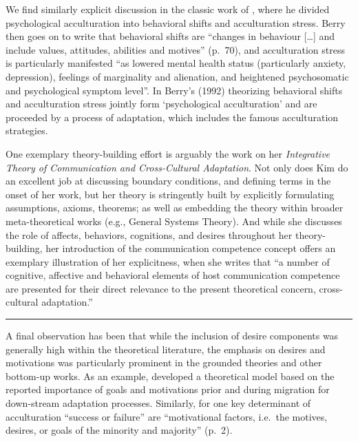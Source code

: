 We find similarly explicit discussion in the classic work of
\citet[][]{Berry1992}, where he divided psychological acculturation into
behavioral shifts and acculturation stress. Berry then goes on to write
that behavioral shifts are ``changes in behaviour {[}\ldots{]} and
include values, attitudes, abilities and motives'' (p.~70), and
acculturation stress is particularly manifested ``as lowered mental
health status (particularly anxiety, depression), feelings of
marginality and alienation, and heightened psychosomatic and
psychological symptom level''. In Berry's (1992) theorizing behavioral
shifts and acculturation stress jointly form `psychological
acculturation' and are proceeded by a process of adaptation, which
includes the famous acculturation strategies.

One exemplary theory-building effort is arguably the work
\citet[][]{Kim1988} on her
\textit{Integrative Theory of Communication and Cross-Cultural Adaptation}.
Not only does Kim do an excellent job at discussing boundary conditions,
and defining terms in the onset of her work, but her theory is
stringently built by explicitly formulating assumptions, axioms,
theorems; as well as embedding the theory within broader
meta-theoretical works (e.g., General Systems Theory). And while she
discusses the role of affects, behaviors, cognitions, and desires
throughout her theory-building, her introduction of the communication
competence concept offers an exemplary illustration of her explicitness,
when she writes that ``a number of cognitive, affective and behavioral
elements of host communication competence are presented for their direct
relevance to the present theoretical concern, cross-cultural
adaptation.''

\begin{center}\rule{0.5\linewidth}{0.5pt}\end{center}

A final observation has been that while the inclusion of desire
components was generally high within the theoretical literature, the
emphasis on desires and motivations was particularly prominent in the
grounded theories and other bottom-up works. As an example,
\citet[][]{Kim2019} developed a theoretical model based on the reported
importance of goals and motivations prior and during migration for
down-stream adaptation processes. Similarly, for
\citet[][]{Mchitarjan2015} one key determinant of acculturation
``success or failure'' are ``motivational factors, i.e.~the motives,
desires, or goals of the minority and majority'' (p.~2).

